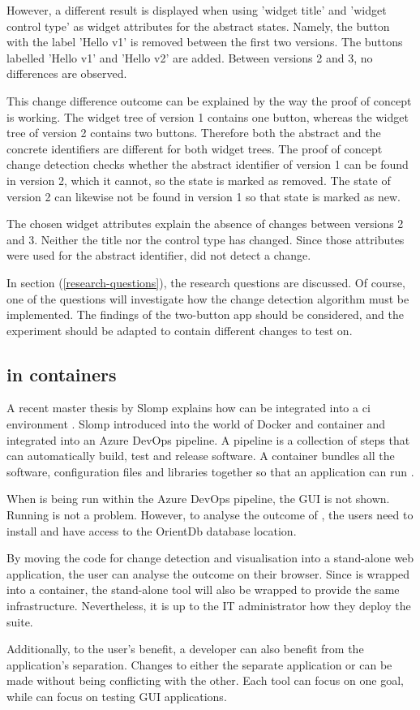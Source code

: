 However, a different result is displayed when using 'widget title' and 'widget control type' as widget attributes for the abstract states. Namely, the button with the label 'Hello v1' is removed between the first two versions. The buttons labelled 'Hello v1' and 'Hello v2' are added. Between versions 2 and 3, no differences are observed.

This change difference outcome can be explained by the way the proof of concept is working. The widget tree of version 1 contains one button, whereas the widget tree of version 2 contains two buttons. Therefore both the abstract and the concrete identifiers are different for both widget trees. The proof of concept change detection checks whether the abstract identifier of version 1 can be found in version 2, which it cannot, so the state is marked as removed. The state of version 2 can likewise not be found in version 1 so that state is marked as new.

The chosen widget attributes explain the absence of changes between versions 2 and 3. Neither the title nor the control type has changed. Since those attributes were used for the abstract identifier, \testar did not detect a change. 

In section (\ref{research-questions}), the research questions are discussed. Of course, one of the questions will investigate how the change detection algorithm must be implemented. The findings of the two-button app should be considered, and the experiment should be adapted to contain different changes to test on. 

\subsection{\testar in containers}\label{sec:testar-in-docker}
A recent master thesis by Slomp explains how \testar can be integrated into a \acrfull{ci} environment \cite{thesisSlomp}. Slomp introduced \testar into the world of Docker and container and integrated \testar into an Azure DevOps pipeline. A pipeline is a collection of steps that can automatically build, test and release software. A container bundles all the software, configuration files and libraries together so that an application can run \cite{ms-container}. 

When \testar is being run within the Azure DevOps pipeline, the \testar GUI is not shown. Running \testar is not a problem. However, to analyse the outcome of \testar, the users need to install \testar and have access to the OrientDb database location. 

By moving the code for change detection and visualisation into a stand-alone web application, the user can analyse the outcome on their browser. Since \testar is wrapped into a container, the stand-alone tool will also be wrapped to provide the same infrastructure. Nevertheless, it is up to the IT administrator how they deploy the \testar suite. 

Additionally, to the user's benefit, a \testar developer can also benefit from the application's separation. Changes to either the separate application or \testar can be made without being conflicting with the other. Each tool can focus on one goal, while \testar can focus on testing GUI applications. 
